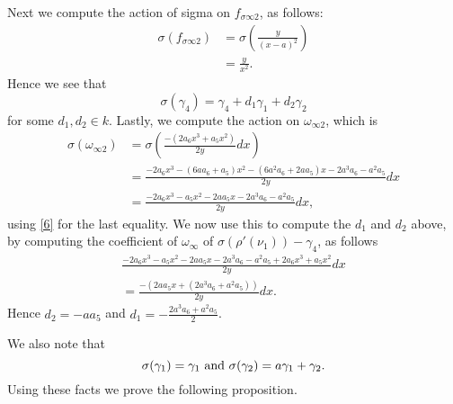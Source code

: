 \documentclass[draft, 11pt]{article} %
\theoremstyle{plain}
\theoremstyle{remark}
\begin{document}
Next we compute the action of sigma on $f_{\sigma \infty 2}$, as follows:
\begin{align*}
\sigma( f_{\sigma \infty 2}) & = \sigma \left( \frac{y}{(x-a)^2} \right) \\
& = \frac{y}{x^2}.
\end{align*}
Hence we see that
\[
\sigma( \gamma_4) = \gamma_4 + d_1\gamma_1 + d_2 \gamma_2
\]
for some $d_1, d_2 \in k$.
Lastly, we compute the action on $\omega_{\infty 2}$, which is
\begin{align*}
\sigma ( \omega_{\infty 2}) & = \sigma \left( \frac{-(2a_6x^3+a_5x^2)}{2y}dx \right) \\
& = \frac{-2a_6x^3-(6aa_6+a_5)x^2-(6a^2a_6+2aa_5)x-2a^3a_6-a^2a_5}{2y}dx \\
& = \frac{-2a_6x^3-a_5x^2 -2aa_5x -2a^3a_6 - a^2a_5}{2y}dx,
\end{align*}
using \ref{6} for the last equality.
We now use this to compute the $d_1$ and $d_2$ above, by computing the coefficient of $\omega_\infty$ of $\sigma(\rho'(\nu_1)) - \gamma_4$, as follows
\begin{multline*}
 \frac{-2a_6x^3-a_5x^2 -2aa_5x -2a^3a_6 - a^2a_5 + 2a_6x^3+a_5x^2}{2y}dx \\
 = \frac{-(2aa_5x +(2a^3a_6+a^2a_5))}{2y}dx.
\end{multline*}
Hence $d_2 = -aa_5$ and $d_1 = -\frac{2a^3a_6+a^2a_5}{2}$.

We also note that
\[
\sigma(\gamma_1) = \gamma_1 \ {\rm and} \ \sigma(\gamma_2) = a\gamma_1 + \gamma_2.
\]
Using these facts we prove the following proposition.
\end{document}
